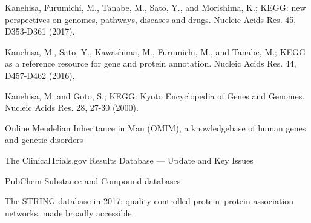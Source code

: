  Kanehisa, Furumichi, M., Tanabe, M., Sato, Y., and Morishima, K.; 
\newblock KEGG: new perspectives on genomes, pathways, diseases and drugs. 
\newblock Nucleic Acids Res. 45, D353-D361 (2017).

 Kanehisa, M., Sato, Y., Kawashima, M., Furumichi, M., and Tanabe, M.; 
\newblock KEGG as a reference resource for gene and protein annotation. 
\newblock Nucleic Acids Res. 44, D457-D462 (2016).

 Kanehisa, M. and Goto, S.; 
\newblock KEGG: Kyoto Encyclopedia of Genes and Genomes. 
\newblock Nucleic Acids Res. 28, 27-30 (2000). 

 Online Mendelian Inheritance in Man (OMIM), a knowledgebase of human genes and genetic disorders

 The ClinicalTrials.gov Results Database — Update and Key Issues

 PubChem Substance and Compound databases

 The STRING database in 2017: quality-controlled protein–protein association networks, made broadly accessible


